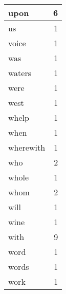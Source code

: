 \begin{center}
\begin{longtable}{l|r}
upon & 6 \\ \hline
us & 1 \\ \hline
voice & 1 \\ \hline
was & 1 \\ \hline
waters & 1 \\ \hline
were & 1 \\ \hline
west & 1 \\ \hline
whelp & 1 \\ \hline
when & 1 \\ \hline
wherewith & 1 \\ \hline
who & 2 \\ \hline
whole & 1 \\ \hline
whom & 2 \\ \hline
will & 1 \\ \hline
wine & 1 \\ \hline
with & 9 \\ \hline
word & 1 \\ \hline
words & 1 \\ \hline
work & 1 \\ \hline
\end{longtable}
\end{center}



\normalsize



